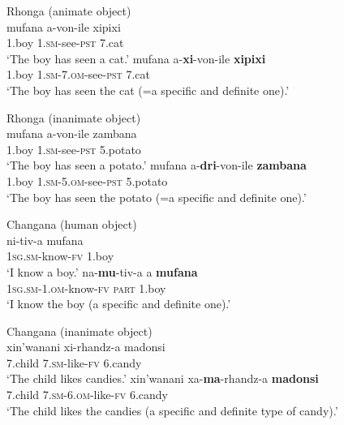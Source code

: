 \documentclass[output=paper]{langsci/langscibook}
\begin{document}
\ea\label{ex:nguna:19} {Rhonga (animate object)}\\
\ea
\gll mufana       a-von-ile                    xipixi\\
     1.boy          1.\textsc{sm}-see-\textsc{pst }             7.cat\\
\glt ‘The boy has seen a cat.’
\ex\label{ex:nguna:}
\gll mufana        a-\textbf{xi}-von-ile                   \textbf{xipixi}\\
     1.boy           \textsc{1.sm-7.om}-see-\textsc{pst}       7.cat\\
\glt ‘The boy has seen the cat (=a specific and definite one).’
\z
\z



\ea\label{ex:nguna:20} {Rhonga (inanimate object)}\\
\ea
\gll mufana       a-von-ile                      zambana\\
     1.boy          1.\textsc{sm}-see-\textsc{pst}                5.potato\\
\glt ‘The boy has seen a potato.’
\ex\label{ex:nguna:}
\gll mufana        a-\textbf{dri}-von-ile                \textbf{zambana}\\
     1.boy           1.\textsc{sm-5.om}-see-\textsc{pst}      5.potato\\
\glt ‘The boy has seen the potato (=a specific and definite one).’
\z
\z



\ea\label{ex:nguna:21} {Changana (human object)}\\
\ea
\gll ni-tiv-a                           mufana\\
     \textsc{1sg.sm}-know-\textsc{fv}           1.boy\\
\glt ‘I know a boy.’
\ex\label{ex:nguna:}
\gll na-\textbf{mu}-tiv-a                            a{\rmfnm}       \textbf{mufana}\\
     \textsc{1sg.sm-1.om}-know-\textsc{fv}          \textsc{part}    1.boy\\
\glt ‘I know the boy (a specific and definite one).’
\z
\z



\ea\label{ex:nguna:22} {Changana (inanimate object)}\\
\ea
\gll xin’wanani        xi-rhandz-a        madonsi\\
     7.child              \textsc{7.sm}-like-\textsc{fv}       6.candy\\
\glt ‘The child likes candies.’
\ex\label{ex:nguna:}
\gll xin’wanani       xa-\textbf{ma}-rhandz-a         \textbf{madonsi}\\
     7.child              \textsc{7.sm-6.om}-like-\textsc{fv}     6.candy\\
\glt ‘The child likes the candies (a specific and definite type of candy).’
\z
\z
\end{document}
